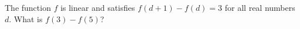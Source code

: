 The function $f$ is linear and satisfies $f(d+1)-f(d)=3$ for all real numbers $d$. What is $f(3)-f(5)$?
